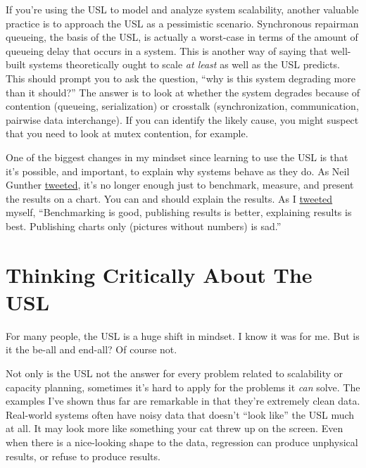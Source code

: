 \documentclass{vivid_layout}
\begin{document}
If you're using the USL to model and analyze system scalability, another
valuable practice is to approach the USL as a pessimistic scenario. Synchronous
repairman queueing, the basis of the USL, is actually a worst-case in terms of
the amount of queueing delay that occurs in a system. This is another way of
saying that well-built systems theoretically ought to scale {\itshape at least}
as well as the USL predicts. This should prompt you to ask the question, ``why
is this system degrading more than it should?'' The answer is to look at
whether the system degrades because of contention (queueing, serialization) or
crosstalk (synchronization, communication, pairwise data interchange). If you
can identify the likely cause, you might suspect that you need to look at mutex
contention, for example.

One of the biggest changes in my mindset since learning to use the USL is that
it's possible, and important, to explain why systems behave as they do. As Neil
Gunther \href{https://twitter.com/DrQz/status/659086348729499649}{tweeted}, it's
no longer enough just to benchmark, measure, and present the results on a chart.
You can and should explain the results. As I
\href{https://twitter.com/xaprb/status/657354190109458433}{tweeted} myself,
``Benchmarking is good, publishing results is better, explaining results is
best. Publishing charts only (pictures without numbers) is sad.''

\newpage
\section{Thinking Critically About The USL}

For many people, the USL is a huge shift in mindset. I know it was for me. But
is it the be-all and end-all? Of course not.

Not only is the USL not the answer for every problem related to scalability
or capacity planning, sometimes it's hard to apply for the problems it
{\itshape can} solve. The examples I've shown thus far are remarkable in that
they're extremely clean data. Real-world systems often have noisy data that
doesn't ``look like'' the USL much at all. It may look more like something your
cat threw up on the screen. Even when there is a nice-looking shape to the data,
regression can produce unphysical results, or refuse to produce results.
\end{document}
